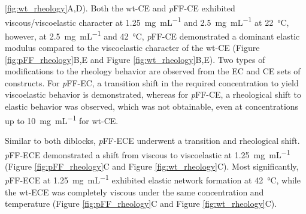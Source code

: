 \begin{refsection}
\ref{fig:wt_rheology}A,D). Both the wt-CE and \emph{p}FF-CE exhibited
viscous/viscoelastic character at \SI{1.25}{\mg\per\mL} and \SI{2.5}{\mg\per\mL}
at \SI{22}{\celsius}, however, at \SI{2.5}{\mg\per\mL} and \SI{42}{\celsius},
\emph{p}FF-CE demonstrated a dominant elastic modulus compared to the
viscoelastic character of the wt-CE (Figure \ref{fig:pFF_rheology}B,E and Figure
\ref{fig:wt_rheology}B,E). Two types of modifications to the rheology behavior
are observed from the EC and CE sets of constructs. For \emph{p}FF-EC, a
transition shift in the required concentration to yield viscoelastic behavior is
demonstrated, whereas for \emph{p}FF-CE, a rheological shift to elastic behavior
was observed, which was not obtainable, even at concentrations up to
\SI{10}{\mg\per\mL} for wt-CE.\cite{Haghpanah2010}

Similar to both diblocks, \emph{p}FF-ECE underwent a transition and rheological
shift.  \emph{p}FF-ECE demonstrated a shift from viscous to viscoelastic at
\SI{1.25}{\mg\per\mL} (Figure \ref{fig:pFF_rheology}C and Figure
\ref{fig:wt_rheology}C). Most significantly, \emph{p}FF-ECE at
\SI{1.25}{\mg\per\mL} exhibited elastic network formation at \SI{42}{\celsius},
while the wt-ECE was completely viscous under the same concentration and
temperature (Figure \ref{fig:pFF_rheology}C and Figure \ref{fig:wt_rheology}C).


\end{refsection}
